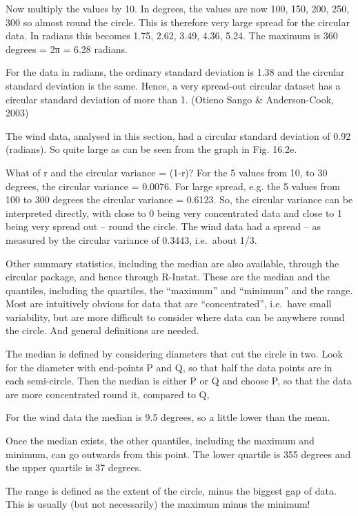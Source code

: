\documentclass[
  letterpaper,
  DIV=11,
  numbers=noendperiod]{scrreprt}
\begin{document}
Now multiply the values by 10. In degrees, the values are now 100, 150,
200, 250, 300 so almost round the circle. This is therefore very large
spread for the circular data. In radians this becomes 1.75, 2.62, 3.49,
4.36, 5.24. The maximum is 360 degrees = 2π = 6.28 radians.

For the data in radians, the ordinary standard deviation is 1.38 and the
circular standard deviation is the same. Hence, a very spread-out
circular dataset has a circular standard deviation of more than 1.
(Otieno Sango \& Anderson-Cook, 2003)

The wind data, analysed in this section, had a circular standard
deviation of 0.92 (radians). So quite large as can be seen from the
graph in Fig. 16.2e.

What of r and the circular variance = (1-r)? For the 5 values from 10,
to 30 degrees, the circular variance = 0.0076. For large spread, e.g.
the 5 values from 100 to 300 degrees the circular variance = 0.6123. So,
the circular variance can be interpreted directly, with close to 0 being
very concentrated data and close to 1 being very spread out -- round the
circle. The wind data had a spread -- as measured by the circular
variance of 0.3443, i.e.~about 1/3.

Other summary statistics, including the median are also available,
through the circular package, and hence through R-Instat. These are the
median and the quantiles, including the quartiles, the ``maximum'' and
``minimum'' and the range. Most are intuitively obvious for data that
are ``concentrated'', i.e.~have small variability, but are more
difficult to consider where data can be anywhere round the circle. And
general definitions are needed.

The median is defined by considering diameters that cut the circle in
two. Look for the diameter with end-points P and Q, so that half the
data points are in each semi-circle. Then the median is either P or Q
and choose P, so that the data are more concentrated round it, compared
to Q,

For the wind data the median is 9.5 degrees, so a little lower than the
mean.

Once the median exists, the other quantiles, including the maximum and
minimum, can go outwards from this point. The lower quartile is 355
degrees and the upper quartile is 37 degrees.

The range is defined as the extent of the circle, minus the biggest gap
of data. This is usually (but not necessarily) the maximum minus the
minimum!
\end{document}
